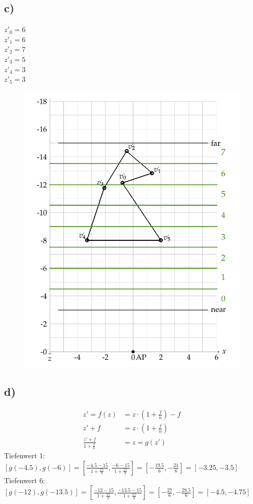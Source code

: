 \documentclass[a4paper,10pt,DIV=14]{article}
\begin{document}
\subsection{c)}
$z'_0 = 6$\\
$z'_1 = 6$\\
$z'_2 = 7$\\
$z'_3 = 5$\\
$z'_4 = 3$\\
$z'_5 = 3$
\begin{figure}[!htbp]
	\centering
	\includegraphics[width=1\linewidth]{2c}
\end{figure}
\subsection{d)}
\begin{align*}
    z' = f(z) &= z \cdot \left( 1 + \frac{f}{n} \right) -f\\
    z' + f &= z \cdot \left( 1 + \frac{f}{n} \right)\\
    \frac{z' + f}{1 + \frac{f}{n}} &= z = g(z')
\end{align*}
Tiefenwert 1:\\
$\left[ g(-4.5), g(-6) \right] = \left[ \frac{-4.5 - 15}{1 + \frac{15}{3}} , \frac{-6 - 15}{1 + \frac{15}{3}} \right] = \left[ -\frac{19.5}{6} , -\frac{21}{6} \right] = \left[ -3.25 , -3.5 \right]$\\
Tiefenwert 6:\\
$\left[ g(-12), g(-13.5) \right] = \left[ \frac{-12 - 15}{1 + \frac{15}{3}} , \frac{-13.5 - 15}{1 + \frac{15}{3}} \right] = \left[ -\frac{27}{6} , -\frac{28.5}{6} \right] = \left[ -4.5 , -4.75 \right]$
\end{document}
